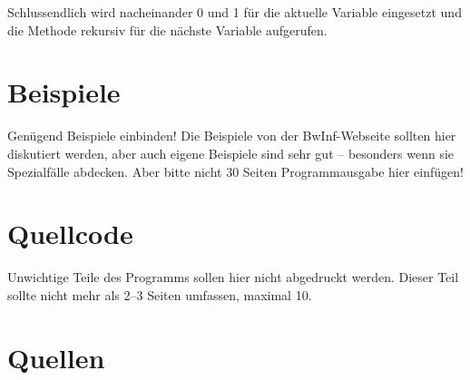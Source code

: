 \documentclass[a4paper,10pt,ngerman]{scrartcl}
\begin{document}
Schlussendlich wird nacheinander 0 und 1 für die aktuelle Variable eingesetzt und die Methode rekursiv für die nächste Variable aufgerufen. 

\section{Beispiele}
Genügend Beispiele einbinden! Die Beispiele von der BwInf-Webseite sollten hier diskutiert werden, aber auch eigene Beispiele sind sehr gut – besonders wenn sie Spezialfälle abdecken. Aber bitte nicht 30 Seiten Programmausgabe hier einfügen!

\section{Quellcode}
Unwichtige Teile des Programms sollen hier nicht abgedruckt werden. Dieser Teil sollte nicht mehr als 2–3 Seiten umfassen, maximal 10.

\section{Quellen}
\printbibliography
\end{document}

